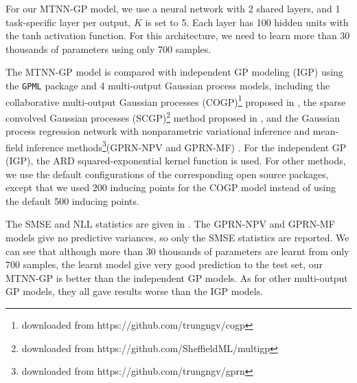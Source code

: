 For our MTNN-GP model, we use a neural network with 2 shared layers, and 1 task-specific layer per output, $K$ is set to 5. Each layer has 100 hidden units with the tanh activation function. For this architecture, we need to learn more than 30 thousands of parameters using only 700 samples.

The MTNN-GP model is compared with independent GP modeling (IGP) using the \texttt{GPML} package\cite{rasmussen2010gaussian} and 4 multi-output Gaussian process models, including the collaborative multi-output Gaussian processes (COGP)\footnote{downloaded from https://github.com/trungngv/cogp} proposed in \cite{nguyen2014collaborative}, the sparse convolved Gaussian processes (SCGP)\footnote{downloaded from https://github.com/SheffieldML/multigp} method proposed in \cite{alvarez2009sparse}, and the Gaussian process regression network with nonparametric variational inference and mean-field inference methods\footnote{downloaded from https://github.com/trungngv/gprn}(GPRN-NPV and GPRN-MF) \cite{nguyen2013efficient}. For the independent GP (IGP), the ARD squared-exponential kernel function is used. For other methods, we use the default configurations of the corresponding open source packages, except that we used 200 inducing points for the COGP model instead of using the default 500 inducing points.

The SMSE and NLL statistics are given in . The GPRN-NPV and GPRN-MF models give no predictive variances, so only the SMSE statistics are reported. We can see that although more than 30 thousands of parameters are learnt from only 700 samples, the learnt model give very good prediction to the test set, our MTNN-GP is better than the independent GP models. As for other multi-output GP models, they all gave results worse than the IGP models.

